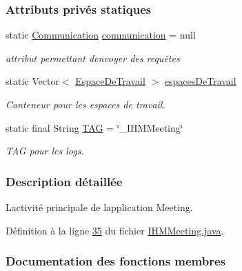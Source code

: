 \subsubsection*{Attributs privés statiques}
\begin{DoxyCompactItemize}
\item 
static \hyperlink{classcom_1_1lasalle_1_1meeting_1_1_communication}{Communication} \hyperlink{classcom_1_1lasalle_1_1meeting_1_1_i_h_m_meeting_a12567e2164a68e0cbe74487935c1263e}{communication} = null
\begin{DoxyCompactList}\small\item\em attribut permettant d\textquotesingle{}envoyer des requêtes \end{DoxyCompactList}\item 
static Vector$<$ \hyperlink{classcom_1_1lasalle_1_1meeting_1_1_espace_de_travail}{Espace\+De\+Travail} $>$ \hyperlink{classcom_1_1lasalle_1_1meeting_1_1_i_h_m_meeting_acba41978aec60c27f07db774f9b68b68}{espaces\+De\+Travail}
\begin{DoxyCompactList}\small\item\em Conteneur pour les espaces de travail. \end{DoxyCompactList}\item 
static final String \hyperlink{classcom_1_1lasalle_1_1meeting_1_1_i_h_m_meeting_a239eafcb0ccc896bdba538d1c0f08e65}{T\+AG} = \char`\"{}\+\_\+\+I\+H\+M\+Meeting\char`\"{}
\begin{DoxyCompactList}\small\item\em T\+AG pour les logs. \end{DoxyCompactList}\end{DoxyCompactItemize}


\subsubsection{Description détaillée}
L\textquotesingle{}activité principale de l\textquotesingle{}application Meeting. 

Définition à la ligne \hyperlink{_i_h_m_meeting_8java_source_l00035}{35} du fichier \hyperlink{_i_h_m_meeting_8java_source}{I\+H\+M\+Meeting.\+java}.



\subsubsection{Documentation des fonctions membres}
\mbox{\label{classcom_1_1lasalle_1_1meeting_1_1_i_h_m_meeting_ad9ff630d7dc8df0155e3a552bfdfed75}} 
